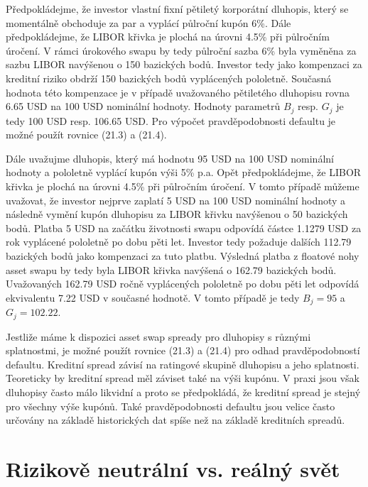 \documentclass[a4paper]{book}
\begin{document}
Předpokládejme, že investor vlastní fixní pětiletý korporátní dluhopis, který se momentálně obchoduje za par a vyplácí půlroční kupón 6\%. Dále předpokládejme, že LIBOR křivka je plochá na úrovni 4.5\% při půlročním úročení. V rámci úrokového swapu by tedy půlroční sazba 6\% byla vyměněna za sazbu LIBOR navýšenou o 150 bazických bodů. Investor tedy jako kompenzaci za kreditní riziko obdrží 150 bazických bodů vyplácených pololetně. Současná hodnota této kompenzace je v případě uvažovaného pětiletého dluhopisu rovna 6.65 USD na 100 USD nominální hodnoty. Hodnoty parametrů $B_j$ resp. $G_j$ je tedy 100 USD resp. 106.65 USD. Pro výpočet pravděpodobnosti defaultu je možné použít rovnice (21.3) a (21.4).

Dále uvažujme dluhopis, který má hodnotu 95 USD na 100 USD nominální hodnoty a pololetně vyplácí kupón výši 5\% p.a. Opět předpokládejme, že LIBOR křivka je plochá na úrovni 4.5\% při půlročním úročení. V tomto případě můžeme uvažovat, že investor nejprve zaplatí 5 USD na 100 USD nominální hodnoty a následně vymění kupón dluhopisu za LIBOR křivku navýšenou o 50 bazických bodů. Platba 5 USD na začátku životnosti swapu odpovídá částce 1.1279 USD za rok vyplácené pololetně po dobu pěti let. Investor tedy požaduje dalších 112.79 bazických bodů jako kompenzaci za tuto platbu. Výsledná platba z floatové nohy asset swapu by tedy byla LIBOR křivka navýšená o 162.79 bazických bodů. Uvažovaných 162.79 USD ročně vyplácených pololetně po dobu pěti let odpovídá ekvivalentu 7.22 USD v současné hodnotě. V tomto případě je tedy $B_j = 95$ a $G_j = 102.22$.

Jestliže máme k dispozici asset swap spready pro dluhopisy s různými splatnostmi, je možné použít rovnice (21.3) a (21.4) pro odhad pravděpodobností defaultu. Kreditní spread závisí na ratingové skupině dluhopisu a jeho splatnosti. Teoreticky by kreditní spread měl záviset také na výši kupónu. V praxi jsou však dluhopisy často málo likvidní a proto se předpokládá, že kreditní spread je stejný pro všechny výše kupónů. Také pravděpodobnosti defaultu jsou velice často určovány na základě historických dat spíše než na základě kreditních spreadů.

\section{Rizikově neutrální vs. reálný svět}
\end{document}
